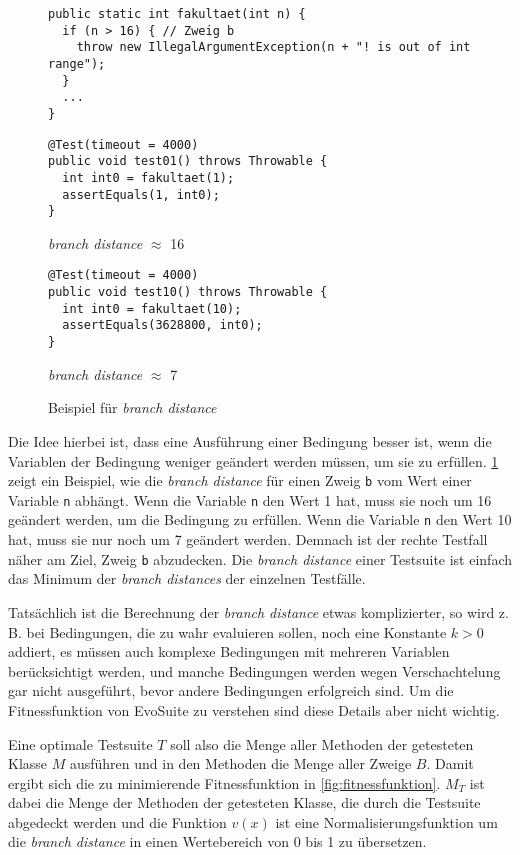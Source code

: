 \documentclass[a4paper,11pt]{article}
\begin{document}
\begin{figure}[h]
	\begin{lstlisting}[basicstyle=\ttfamily\tiny]
public static int fakultaet(int n) {
  if (n > 16) { // Zweig b
    throw new IllegalArgumentException(n + "! is out of int range");
  }
  ...
}
	\end{lstlisting}
	\begin{multicols}{2}
		\begin{lstlisting}[basicstyle=\ttfamily\tiny]
@Test(timeout = 4000)
public void test01() throws Throwable {
  int int0 = fakultaet(1);
  assertEquals(1, int0);
}
		\end{lstlisting}
		\textit{branch distance} $\approx$ 16
		\columnbreak
		\begin{lstlisting}[basicstyle=\ttfamily\tiny]
@Test(timeout = 4000)
public void test10() throws Throwable {
  int int0 = fakultaet(10);
  assertEquals(3628800, int0);
}
		\end{lstlisting}
		\textit{branch distance} $\approx$ 7
	\end{multicols}
	\caption{Beispiel für \textit{branch distance}}
	\label{fig:branch_distance}
\end{figure}

Die Idee hierbei ist, dass eine Ausführung einer Bedingung besser ist, wenn die Variablen der Bedingung weniger geändert werden müssen, um sie zu erfüllen.
\cref{fig:branch_distance} zeigt ein Beispiel, wie die \textit{branch distance} für einen Zweig \texttt{b} vom Wert einer Variable \texttt{n} abhängt.
Wenn die Variable \texttt{n} den Wert 1 hat, muss sie noch um 16 geändert werden, um die Bedingung zu erfüllen.
Wenn die Variable \texttt{n} den Wert 10 hat, muss sie nur noch um 7 geändert werden.
Demnach ist der rechte Testfall näher am Ziel, Zweig \texttt{b} abzudecken.
Die \textit{branch distance} einer Testsuite ist einfach das Minimum der \textit{branch distances} der einzelnen Testfälle.

Tatsächlich ist die Berechnung der \textit{branch distance} etwas komplizierter, so wird z. B. bei Bedingungen, die zu wahr evaluieren sollen, noch eine Konstante $k > 0$ addiert, es müssen auch komplexe Bedingungen mit mehreren Variablen berücksichtigt werden, und manche Bedingungen werden wegen Verschachtelung gar nicht ausgeführt, bevor andere Bedingungen erfolgreich sind.
Um die Fitnessfunktion von EvoSuite zu verstehen sind diese Details aber nicht wichtig.

Eine optimale Testsuite $T$ soll also die Menge aller Methoden der getesteten Klasse $M$ ausführen und in den Methoden die Menge aller Zweige $B$.
Damit ergibt sich die zu minimierende Fitnessfunktion in \cref{fig:fitnessfunktion}.
$M_T$ ist dabei die Menge der Methoden der getesteten Klasse, die durch die Testsuite abgedeckt werden und die Funktion $v(x)$ ist eine Normalisierungsfunktion um die \textit{branch distance} in einen Wertebereich von 0 bis 1 zu übersetzen.
\end{document}
